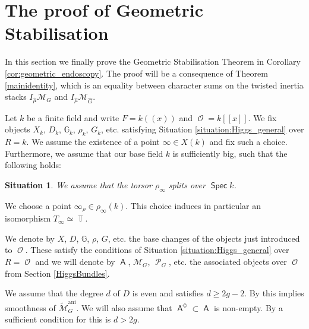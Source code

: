 \documentclass{article}
\DeclareMathOperator{\A}{\mathsf{A}}
\DeclareMathOperator{\ani}{ani}
\DeclareMathOperator{\Tb}{\mathbb{T}}
\newcommand{\Mc}{\mathcal{M}}
\DeclareMathOperator{\Pc}{\mathcal{P}}
\DeclareMathOperator{\Spec}{\mathsf{Spec}}
\DeclareMathOperator{\Oo}{\mathcal{O}}
\newcommand{\BG}{{\mathbb{G}}}
\newcommand{\CE}{{\mathcal E}}
\theoremstyle{definition}
\theoremstyle{plain}
\newtheorem{situation}[definition]{Situation}
\begin{document}
\section{The proof of Geometric Stabilisation}\label{proofgst}

In this section we finally prove the Geometric Stabilisation Theorem in Corollary \ref{cor:geometric_endoscopy}. The proof will be a consequence of Theorem \ref{mainidentity}, which is an equality between character sums on the twisted inertia stacks $I_{\widehat{\mu}}\Mc_G$ and $I_{\widehat{\mu}}\Mc_{\widehat{G}}$.

Let $k$ be a finite field and write $F=k((x))$ and $\Oo = k[[x]]$. We fix objects $X_k$, $D_k$, $\BG_k$, $\rho_k$, $G_k$, etc. satisfying Situation \ref{situation:Higgs_general} over $R=k$. We assume the existence of a point $\infty \in X(k)$ and fix such a choice. 
Furthermore, we assume that our base field $k$ is sufficiently big, such that the following holds:

\begin{situation}\label{situation:split}
We assume that the torsor $\rho_{\infty}$ splits over $\Spec k$. 
\end{situation}
We choose a point $\infty_\rho \in \rho_\infty(k)$. This choice induces in particular an isomorphism $T_{\infty} \simeq \Tb$.

We denote by $X$, $D$, $\BG$, $\rho$, $G$, etc. the base changes of the objects just introduced to $\Oo$. These satisfy the conditions of Situation \ref{situation:Higgs_general} over $R=\Oo$ and we will denote by $\A$, $\Mc_G$, $\Pc_G$, etc. the associated objects over $\Oo$ from Section \ref{HiggsBundles}.

We assume that the degree $d$ of $D$ is even and satisfies $d \geq 2g-2$. By \cite[4.14.1]{MR2653248} this implies smoothness of $\widetilde{\Mc}_G^{\ani}$. We will also assume that $\A^\Diamond \subset \A$ is non-empty. By \cite[4.7.1]{MR2653248} a sufficient condition for this is $d > 2g$.
\end{document}
